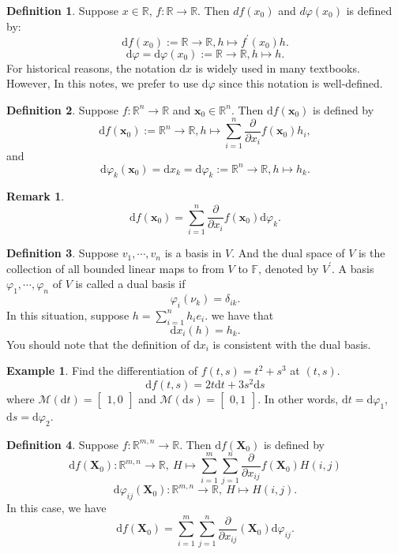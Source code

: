 \documentclass[12pt]{article}
\theoremstyle{definition}
\newtheorem{definition}{Definition}[section]
\newtheorem{example}{Example}[section]
\newtheorem{remark}{Remark}
\newcommand{\x}{\mathbf{x}}
\newcommand{\R}{\mathbb{R}}
\newcommand{\F}{\mathbb{F}}
\newcommand{\X}{\mathbf{X}}
\newcommand{\D}{\mathrm{d}}
\newcommand{\M}{\mathcal{M}}
\newcommand{\pd}[1]{\frac{\partial}{\partial #1}}
\begin{document}
\begin{definition}
Suppose $x \in \R$, $f:\R \to \R$. Then $df(x_0)$ and $d\varphi(x_0)$ is defined by:
$$
\D f(x_0) := \R \to \R, h \mapsto f^\prime(x_0)h.
$$
$$
\D \varphi=\D \varphi(x_0) := \R \to \R, h \mapsto h.
$$
For historical reasons, the notation $\D x$ is widely used in many textbooks. However, In this notes, we prefer to use $\D \varphi$ since this notation is well-defined.  

\end{definition}


\begin{definition} Suppose $f: \R^n \to \R$ and $\x_0 \in \R^n$. Then $\D f(\x_0)$ is defined by
$$
\D f(\x_0) := \R^n \to \R, h\mapsto \sum_{i=1}^{n} \pd{x_i}f(\x_0)h_i,
$$
and
$$
\D \varphi_k(\x_0) =\D x_k = \D \varphi_k := \R^n \to \R, h\mapsto h_k. 
$$	
\end{definition}

\begin{remark}
$$
\D f(\x_0)=\sum_{i=1}^n \pd{x_i}f(\x_0)\D \varphi_k.
$$	
\end{remark}

\begin{definition}
Suppose $v_1,\cdots,v_n$ is a basis in $V$. And the dual space of $V$ is the collection of all bounded linear maps to from $V$ to $\F$, denoted by $V^\prime$. A basis $\varphi_1,\cdots,\varphi_n$ of $V$ is called a dual basis if 
$$
\varphi_i(\nu_k) = \delta_{ik}.
$$
In this situation, suppose $h = \sum_{i=1}^{n}h_i e_i$. we have that 
$$
\D x_i (h)=h_k.
$$
You should note that the definition of $\D x_i$ is consistent with the dual basis.
\end{definition}




\begin{example}
Find the differentiation of $f(t,s)=t^2+s^3$ at $(t,s)$.  \\
$$\D f(t,s)=2t\D t+3s^2\D s$$
where $\M (\D t)=\begin{bmatrix}
	1,0
\end{bmatrix}$ and $\M (\D s)=\begin{bmatrix}
	0,1
\end{bmatrix}$. In other words, $\D t = \D \varphi_1$, $\D s = \D \varphi_2$.
\end{example}



\begin{definition} Suppose $f:\R^{m,n} \to \R$. Then $\D f(\X_0)$ is defined by
$$
\D f(\X_0): \R^{m,n} \to \R, \ H \mapsto \sum_{i=1}^m \sum_{j=1}^n \pd{x_{ij}}f(\X_0)H(i,j)
$$
$$
\D \varphi_{ij}(\X_0): \R^{m,n} \to \R, \ H \mapsto H(i,j).
$$
In this case, we have
$$
\D f(\X_0) = \sum_{i=1}^m \sum_{j=1}^n \pd{x_{ij}}(\X_0) \D \varphi_{ij}.
$$
\end{definition}
\end{document}
